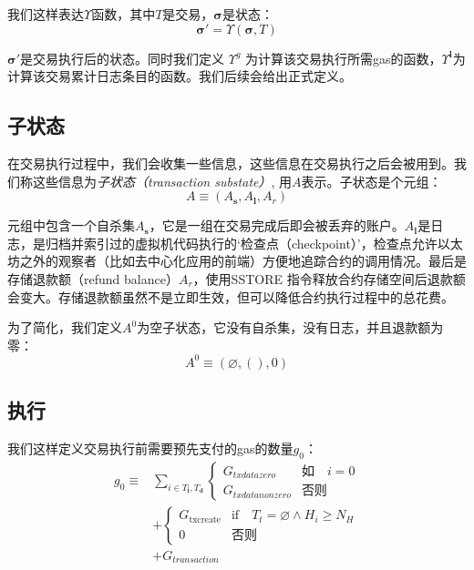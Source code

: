 \documentclass[UTF8,nofonts]{ctexart}
\newcommand{\firsthomesteadblock}{\ensuremath{N_H}}
\begin{document}
\begin{multicols}{2}
我们这样表达$\Upsilon$函数，其中$T$是交易，$\boldsymbol{\sigma}$是状态：
\begin{equation}
\boldsymbol{\sigma}' = \Upsilon(\boldsymbol{\sigma}, T)
\end{equation}

$\boldsymbol{\sigma}'$是交易执行后的状态。同时我们定义 $\Upsilon^g$ 为计算该交易执行所需gas的函数，$\Upsilon^\mathbf{l}$为计算该交易累计日志条目的函数。我们后续会给出正式定义。

\subsection{子状态} 
在交易执行过程中，我们会收集一些信息，这些信息在交易执行之后会被用到。我们称这些信息为\textit{子状态（transaction substate）}, 用$A$表示。子状态是个元组：
\begin{equation}
A \equiv (A_\mathbf{s}, A_\mathbf{l}, A_r)
\end{equation}

元组中包含一个自杀集$A_\mathbf{s}$，它是一组在交易完成后即会被丢弃的账户。$A_\mathbf{l}$是日志，是归档并索引过的虚拟机代码执行的`检查点（checkpoint）'，检查点允许以太坊之外的观察者（比如去中心化应用的前端）方便地追踪合约的调用情况。最后是存储退款额（refund balance）$A_r$，使用{\small SSTORE} 指令释放合约存储空间后退款额会变大。存储退款额虽然不是立即生效，但可以降低合约执行过程中的总花费。

为了简化，我们定义$A^0$为空子状态，它没有自杀集，没有日志，并且退款额为零：
\begin{equation}
A^0 \equiv (\varnothing, (), 0)
\end{equation}

\subsection{执行}
我们这样定义交易执行前需要预先支付的gas的数量$g_0$：
\begin{align}
g_0 \equiv {} & \sum_{i \in T_\mathbf{i}, T_\mathbf{d}} \begin{cases} G_{txdatazero} & \text{如} \quad i = 0 \\ G_{txdatanonzero} & \text{否则} \end{cases} \\
{} & + \begin{cases} G_\text{txcreate} & \text{if} \quad T_t = \varnothing \wedge H_i \geq \firsthomesteadblock \\ 0 & \text{否则} \end{cases} \\
{} & + G_{transaction}
\end{align}


\end{multicols}
\end{document}
